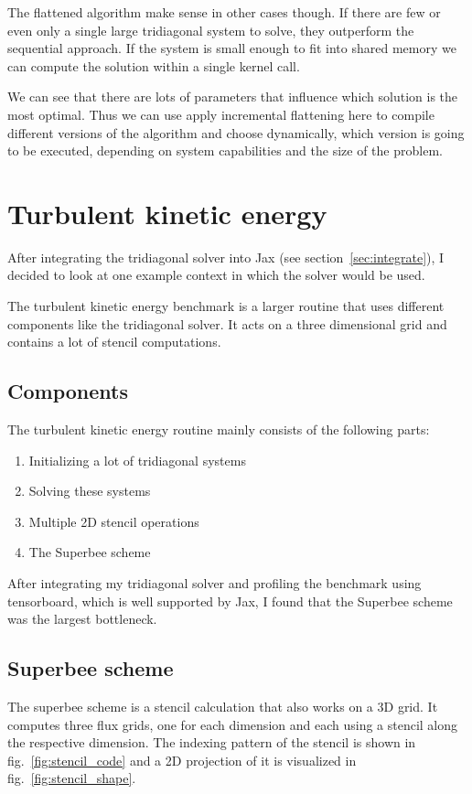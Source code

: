 \documentclass[a4paper,oneside]{memoir}
\begin{document}
The flattened algorithm make sense in other cases though. If there are few or even only a single large tridiagonal system to solve, they outperform the sequential approach. If the system is small enough to fit into shared memory we can compute the solution within a single kernel call. 

We can see that there are lots of parameters that influence which solution is the most optimal. Thus we can use apply incremental flattening \cite{incremental} here to compile different versions of the algorithm and choose dynamically, which version is going to be executed, depending on system capabilities and the size of the problem.



\section{Turbulent kinetic energy}
After integrating the tridiagonal solver into Jax (see section~\ref{sec:integrate}), I decided to look at one example context in which the solver would be used.

The turbulent kinetic energy benchmark is a larger routine that uses different components like the tridiagonal solver. It acts on a three dimensional grid and contains a lot of stencil computations. 
\subsection{Components}
The turbulent kinetic energy routine mainly consists of the following parts:
\begin{enumerate}
    \item Initializing a lot of tridiagonal systems
    \item Solving these systems 
    \item Multiple 2D stencil operations
    \item The Superbee scheme
\end{enumerate}
After integrating my tridiagonal solver and profiling the benchmark using tensorboard, which is well supported by Jax, I found that the Superbee scheme was the largest bottleneck.  
\subsection{Superbee scheme}
The superbee scheme is a stencil calculation that also works on a 3D grid. It computes three flux grids, one for each dimension and each using a stencil along the respective dimension. 
The indexing pattern of the stencil is shown in fig.~\ref{fig:stencil_code} and a 2D projection of it is visualized in fig.~\ref{fig:stencil_shape}. 
\end{document}
